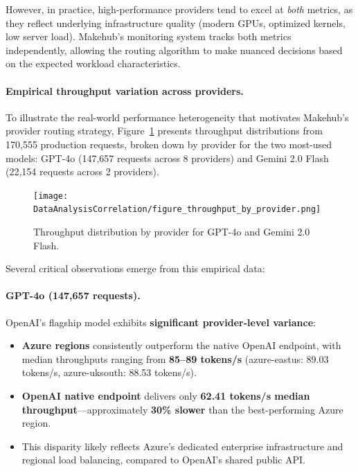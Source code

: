 \documentclass[english]{article}
\begin{document}
However, in practice, high-performance providers tend to excel at \emph{both} metrics, as they reflect underlying infrastructure quality (modern GPUs, optimized kernels, low server load). Makehub's monitoring system tracks both metrics independently, allowing the routing algorithm to make nuanced decisions based on the expected workload characteristics.

\paragraph{Empirical throughput variation across providers.}

To illustrate the real-world performance heterogeneity that motivates Makehub's provider routing strategy, Figure~\ref{fig:throughput_by_provider} presents throughput distributions from 170,555 production requests, broken down by provider for the two most-used models: GPT-4o (147,657 requests across 8 providers) and Gemini 2.0 Flash (22,154 requests across 2 providers).

\begin{figure}[H]
\centering
\texttt{[image: DataAnalysisCorrelation/figure\_throughput\_by\_provider.png]}
\caption{Throughput distribution by provider for GPT-4o and Gemini 2.0 Flash.}
\label{fig:throughput_by_provider}
\end{figure}

Several critical observations emerge from this empirical data:

\paragraph{GPT-4o (147,657 requests).} OpenAI's flagship model exhibits \textbf{significant provider-level variance}:
\begin{itemize}
    \item \textbf{Azure regions} consistently outperform the native OpenAI endpoint, with median throughputs ranging from \textbf{85--89 tokens/s} (azure-eastus: 89.03 tokens/s, azure-uksouth: 88.53 tokens/s).
    \item \textbf{OpenAI native endpoint} delivers only \textbf{62.41 tokens/s median throughput}—approximately \textbf{30\% slower} than the best-performing Azure region.
    \item This disparity likely reflects Azure's dedicated enterprise infrastructure and regional load balancing, compared to OpenAI's shared public API.
\end{itemize}
\end{document}
